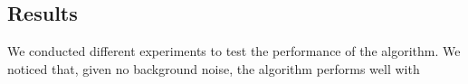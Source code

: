 \documentclass[conference]{IEEEtran}
\begin{document}
\subsection{Results}
We conducted different experiments to test the performance of the algorithm. We noticed that, given no background noise, the algorithm performs well with




\vspace{12pt}
\color{red}
\end{document}
